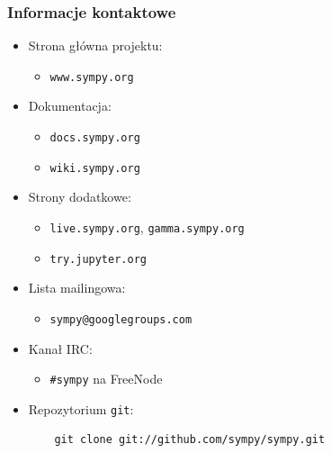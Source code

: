 \documentclass[10pt]{beamer}
\begin{document}
\begin{frame}[fragile]
  \frametitle{Informacje kontaktowe}

  \begin{itemize}
    \item Strona główna projektu:
      \begin{itemize}
        \item \texttt{www.sympy.org}
      \end{itemize}
    \item Dokumentacja:
      \begin{itemize}
        \item \texttt{docs.sympy.org}
        \item \texttt{wiki.sympy.org}
      \end{itemize}
    \item Strony dodatkowe:
      \begin{itemize}
        \item \texttt{live.sympy.org}, \texttt{gamma.sympy.org}
        \item \texttt{try.jupyter.org}
      \end{itemize}
    \item Lista mailingowa:
      \begin{itemize}
        \item \texttt{sympy@googlegroups.com}
      \end{itemize}
    \item Kanał IRC:
      \begin{itemize}
        \item \texttt{\#sympy} na FreeNode
      \end{itemize}
    \item Repozytorium \texttt{git}:
    \begin{verbatim}
    git clone git://github.com/sympy/sympy.git
    \end{verbatim}
  \end{itemize}
\end{frame}
\end{document}

